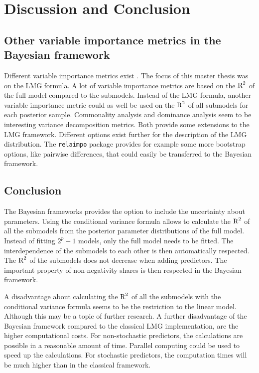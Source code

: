\documentclass[11pt,a4paper,twoside]{book}
\begin{document}






\chapter{Discussion and Conclusion}

\section{Other variable importance metrics in the Bayesian framework}

Different variable importance metrics exist \citep{Gromping2015}. The focus of this master thesis was on the LMG formula.  A lot of variable importance metrics are based on the $\text{R}^2$ of the full model compared to the submodels. Instead of the LMG formula, another variable importance metric could as well be used on the $\text{R}^2$ of all  submodels for each posterior sample. Commonality analysis \citep{Nimon2008} and dominance analysis \citep{Gromping2015} seem to be interesting variance decomposition metrics. Both provide some extensions to the LMG framework. Different options exist further for the description of the LMG distribution. The \texttt{relaimpo} package provides for example some more bootstrap options, like pairwise differences, that could easily be transferred to the Bayesian framework. 
 
\section{Conclusion}

The Bayesian frameworks provides the option to include the uncertainty about parameters.  Using  the conditional variance formula allows to calculate the $\text{R}^2$ of all the submodels from the posterior parameter distributions of the full model. Instead of fitting $2^{p}-1$ models, only the full model needs to be fitted. The interdependence of the submodels to each other is then automatically respected. The $\text{R}^2$ of the submodels does not decrease when adding predictors. The important property of non-negativity shares is then respected in the Bayesian framework.

A disadvantage about calculating the $\text{R}^2$ of all the submodels with the conditional variance formula seems to be the restriction to the linear model. Although this may be a topic of further research. A further disadvantage of the Bayesian framework compared to the classical LMG implementation, are the higher computational costs. For non-stochastic predictors, the calculations are possible in a reasonable amount of time. Parallel computing could be used to speed up the calculations. For stochastic predictors, the computation times will be much higher than in the classical framework.
\end{document}
